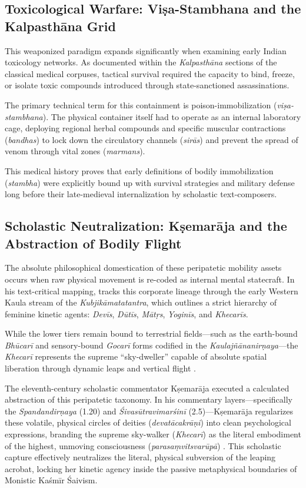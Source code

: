 \documentclass[11pt,twoside,letterpaper]{article}
\begin{document}
\subsection{Toxicological Warfare: Viṣa-Stambhana and the Kalpasthāna Grid}
This weaponized paradigm expands significantly when examining early Indian toxicology networks. As documented within the \textit{Kalpasthāna} sections of the classical medical corpuses, tactical survival required the capacity to bind, freeze, or isolate toxic compounds introduced through state-sanctioned assassinations. 

The primary technical term for this containment is poison-immobilization (\textit{viṣa-stambhana}). The physical container itself had to operate as an internal laboratory cage, deploying regional herbal compounds and specific muscular contractions (\textit{bandhas}) to lock down the circulatory channels (\textit{sirās}) and prevent the spread of venom through vital zones (\textit{marmans}). 

This medical history proves that early definitions of bodily immobilization (\textit{stambha}) were explicitly bound up with survival strategies and military defense long before their late-medieval internalization by scholastic text-composers.

\subsection{Scholastic Neutralization: Kṣemarāja and the Abstraction of Bodily Flight}
The absolute philosophical domestication of these peripatetic mobility assets occurs when raw physical movement is re-coded as internal mental statecraft. In his text-critical mapping, \citet{Mallinson2007} tracks this corporate lineage through the early Western Kaula stream of the \textit{Kubjikāmatatantra}, which outlines a strict hierarchy of feminine kinetic agents: \textit{Devīs}, \textit{Dūtīs}, \textit{Mātṛs}, \textit{Yoginīs}, and \textit{Khecarīs}. 

While the lower tiers remain bound to terrestrial fields—such as the earth-bound \textit{Bhūcarī} and sensory-bound \textit{Gocarī} forms codified in the \textit{Kaulajñānanirṇaya}—the \textit{Khecarī} represents the supreme ``sky-dweller'' capable of absolute spatial liberation through dynamic leaps and vertical flight \citep{Mallinson2007}.

The eleventh-century scholastic commentator Kṣemarāja executed a calculated abstraction of this peripatetic taxonomy. In his commentary layers—specifically the \textit{Spandandirṇaya} (1.20) and \textit{Śivasūtravimarśinī} (2.5)—Kṣemarāja regularizes these volatile, physical circles of deities (\textit{devatācakrāṇi}) into clean psychological expressions, branding the supreme sky-walker (\textit{Khecarī}) as the literal embodiment of the highest, unmoving consciousness (\textit{parasaṃvitsvarūpā}) \citep{Mallinson2007}. This scholastic capture effectively neutralizes the literal, physical subversion of the leaping acrobat, locking her kinetic agency inside the passive metaphysical boundaries of Monistic Kaśmīr Śaivism.
\end{document}
